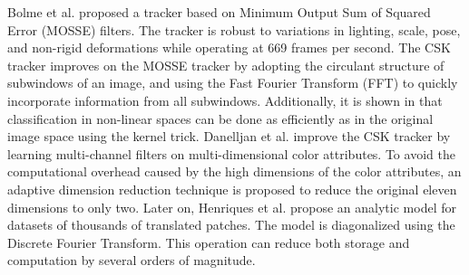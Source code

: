 \documentclass[review]{elsarticle}
\begin{document}
\begin{CJK*}{UTF8}{gbsn}
Bolme et al. proposed a tracker \cite{Bolme2010VisualOT} based on Minimum Output Sum of Squared Error (MOSSE) filters. The tracker is robust to variations in lighting, scale, pose, and non-rigid deformations while operating at 669 frames per second.
The CSK tracker \cite{Henriques2012ExploitingTC} improves on the MOSSE tracker by adopting the circulant structure of subwindows of an image, and using the Fast Fourier Transform (FFT) to quickly incorporate information from all subwindows. Additionally, it is shown in \cite{Henriques2012ExploitingTC} that classification in non-linear spaces can be done as efficiently as in the original image space using the kernel trick.
Danelljan et al. \cite{Danelljan2014AdaptiveCA} improve the CSK tracker by learning multi-channel filters on multi-dimensional color attributes. To avoid the computational overhead caused by the high dimensions of the color attributes, an adaptive dimension reduction technique is proposed \cite{Danelljan2014AdaptiveCA} to reduce the original eleven dimensions to only two.
Later on, Henriques et al. \cite{Henriques2015HighSpeedTW} propose an analytic model for datasets of thousands of translated patches. The model is diagonalized using the Discrete Fourier Transform. This operation can reduce both storage and computation by several orders of magnitude.


\end{CJK*}
\end{document}
